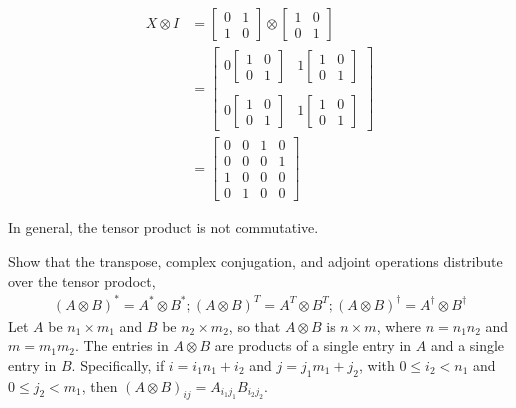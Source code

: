 \begin{align*}
	X \otimes I &= \begin{bmatrix}
		0 & 1 \\
		1 & 0
	\end{bmatrix}
	\otimes
	\begin{bmatrix}
		1 & 0 \\
		0 & 1
	\end{bmatrix}\\
	&=\begin{bmatrix}
		0\begin{bmatrix}
			1 & 0 \\
			0 & 1
		\end{bmatrix}
		&
		1\begin{bmatrix}
			1 & 0 \\
			0 & 1
		\end{bmatrix}
		\\ \\
		0\begin{bmatrix}
			1 & 0 \\
			0 & 1
		\end{bmatrix}
		&
		1\begin{bmatrix}
			1 & 0 \\
			0 & 1
		\end{bmatrix}
	\end{bmatrix} \\
	&= \begin{bmatrix}
	0 & 0 & 1 & 0 \\
	0 & 0 & 0 & 1 \\
	1 & 0 & 0 & 0 \\
	0 & 1 & 0 & 0
	\end{bmatrix}
\end{align*}

In general, the tensor product is not commutative.

 Show that the transpose, complex conjugation, and adjoint operations distribute over the tensor prodoct,
\begin{align*}(A\otimes B)^* = A^*\otimes B^*; (A\otimes B)^T = A^T\otimes B^T; (A\otimes B)^\dagger = A^\dagger \otimes B^\dagger\end{align*}
\Soln Let $A$ be $n_1\times m_1$ and $B$ be $n_2\times m_2$, so that $A\otimes B$ is $n\times m$, where $n=n_1n_2$ and $m=m_1m_2$.  The entries in $A\otimes B$ are products of a single entry in $A$ and a single entry in $B$.  Specifically, if $i = i_1n_1+i_2$ and $j = j_1m_1+j_2$, with $0\leq i_2 < n_1$ and $0\leq j_2 <  m_1$, then $(A\otimes B)_{ij}= A_{i_1j_1}B_{i_2j_2}$.

